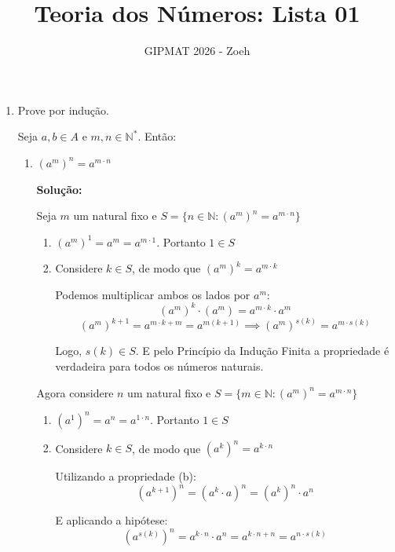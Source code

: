\documentclass[
  12pt,
  openright,
  a4paper,
  twoside,
  english,
  brazil,
]{article}
\title{Teoria dos Números: Lista 01}
\author{GIPMAT 2026 - Zoeh}
\date{}
\begin{document}
\maketitle

\begin{enumerate}[\bfseries  1.]

  \item Prove por indução.

    Seja $a, b\in A$ e $m, n\in\mathbb N^*$. Então:

    \begin{enumerate}[\bfseries (a)]
      \item $(a^m)^n=a^{m\cdot n}$

        \textbf{Solução:}

        Seja $m$ um natural fixo e $S=\{n\in\mathbb N:(a^m)^n=a^{m\cdot n}\}$

        \begin{enumerate}[1.]
          \item $(a^m)^1= a^m=a^{m\cdot 1}$. Portanto $1\in S$
          \item Considere $k\in S$, de modo que $(a^m)^k=a^{m\cdot k}$

            Podemos multiplicar ambos os lados por $a^m$:
            $$
            (a^m)^k\cdot (a^m)=a^{m\cdot k}\cdot a^m
            $$
            $$
            (a^m)^{k+1}=a^{m\cdot k+m}=a^{m(k+1)}\implies
            (a^m)^{s(k)}=a^{m\cdot s(k)}
            $$

            Logo, $s(k)\in S$. E pelo Princípio da Indução Finita a
            propriedade é verdadeira para todos os números naturais.

        \end{enumerate}

        Agora considere $n$ um natural fixo e $S=\{m\in\mathbb
        N:(a^m)^n=a^{m\cdot n}\}$

        \begin{enumerate}[1.]
          \item $(a^1)^n= a^n=a^{1\cdot n}$. Portanto $1\in S$
          \item Considere $k\in S$, de modo que $(a^k)^n=a^{k\cdot n}$

            Utilizando a propriedade (b):
            $$
            (a^{k+1})^n=(a^k\cdot a)^n=(a^k)^n\cdot a^n
            $$

            E aplicando a hipótese:
            $$
            (a^{s(k)})^n=a^{k\cdot n}\cdot a^n=a^{k\cdot n+n}=a^{n\cdot s(k)}
            $$


\end{enumerate}
\end{enumerate}
\end{enumerate}
\end{document}
